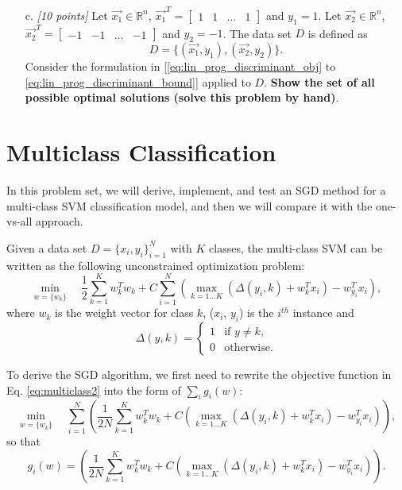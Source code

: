 \begin{enumerate}
\item [c.] {\em [10 points]} 
Let $\vec{x_1} \in \mathbb{R}^n$, $\vec{x_1}^T =
\begin{bmatrix}
  1 & 1 & \ldots & 1
\end{bmatrix}$ and $y_1 = 1$. 
Let
$\vec{x_2} \in \mathbb{R}^n$, $\vec{x_2}^T =
\begin{bmatrix}
  -1 & -1 & \ldots & -1
\end{bmatrix}$ and $y_2 = -1$.
The data set $D$ is defined as
\begin{equation*}
    D = \{ (\vec{x_1},y_1), (\vec{x_2},y_2)\}.
\end{equation*}
Consider the formulation in
[\eqref{eq:lin_prog_discriminant_obj} to \eqref{eq:lin_prog_discriminant_bound}]
applied to
$D$. {\bf Show the set of all possible optimal solutions (solve this problem by hand)}.
  
  \end{enumerate}

\section{Multiclass Classification} 
In this problem set, we will derive, implement, and test an SGD method for a multi-class SVM classification model, and then we will compare it with the one-vs-all approach. 

Given a data set $D = \{x_i, y_i\}_{i=1}^N$ with $K$ classes, the multi-class SVM can be written as the following  unconstrained optimization problem:
\begin{equation}
\label{eq:multiclass2}
    \min_{w=\{w_k\}} \quad \frac{1}{2} \sum_{k=1}^K w_k^T w_k + C \sum_{i=1}^N \left( \max_{k=1\ldots K} \left(\Delta(y_i, k)+w_k^Tx_i\right)-w^T_{y_i} x_i\right),
\end{equation}
where  $w_k$ is the weight vector for class $k$, ($x_i$, $y_i$) is the $i^{th}$ instance and 
\begin{equation*}
\Delta(y,k) = 
    \begin{cases}
    1 & \mbox{if } y\neq k,\\
    0 & \mbox{otherwise}.
    \end{cases}
\end{equation*}

To derive the SGD  algorithm, we first need to rewrite the objective function in Eq. \eqref{eq:multiclass2} into the form of $\sum_i g_i(w)$:
\begin{equation*}
\label{eq:multiclass}
    \min_{w=\{w_k\}} \quad \sum^N_{i=1} \left(\frac{1}{2N} \sum^K_{k=1} w_k^T w_k + C  \left( \max_{k=1\ldots K} \left(\Delta(y_i, k)+w_k^Tx_i\right)-w^T_{y_i} x_i\right)\right),
\end{equation*}
so that 
\begin{equation*}
    g_i(w) =  \left(\frac{1}{2N} \sum^K_{k=1} w_k^T w_k + C  \left( \max_{k=1\ldots K} \left(\Delta(y_i, k)+w_k^Tx_i\right)-w^T_{y_i} x_i\right)\right). 
\end{equation*}


